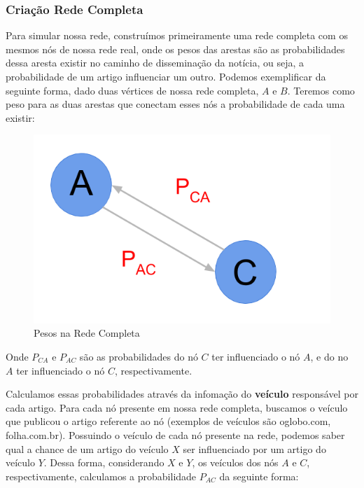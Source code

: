 \documentclass[a4paper,12pt]{article}
\begin{document}
\subsubsection{Criação Rede Completa}


 Para simular nossa rede, construímos primeiramente uma rede completa com os mesmos nós de nossa rede real, onde os pesos das arestas
 são as probabilidades dessa aresta existir no caminho de disseminação da notícia, ou seja, a probabilidade de um artigo influenciar um 
 outro. Podemos exemplificar da seguinte forma, dado duas vértices de nossa rede completa, $A$ e $B$. Teremos como peso para as duas 
 arestas que conectam esses nós a probabilidade de cada uma existir:
 
 \begin{figure}[ht]
 \centering
 \includegraphics[scale=0.3]{./rede5.png}
 \caption{Pesos na Rede Completa}
\end{figure}

 Onde $P_{CA}$ e $P_{AC}$ são as probabilidades do nó $C$ ter influenciado o nó $A$, e do no $A$ ter influenciado o nó $C$, 
 respectivamente.

 Calculamos essas probabilidades através da infomação do \textbf{veículo} responsável por cada artigo. Para cada nó presente em nossa rede completa,
 buscamos o veículo que publicou o artigo referente ao nó (exemplos de veículos são oglobo.com, folha.com.br). Possuindo o veículo de cada
 nó presente na rede, podemos saber qual a chance de um artigo do veículo $X$ ser influenciado por um artigo do veículo $Y$. Dessa forma, 
 considerando $X$ e $Y$, os veículos dos nós $A$ e $C$, respectivamente, calculamos a probabilidade $P_{AC}$ da seguinte forma:
 
\end{document}
